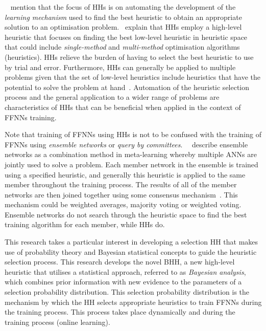\citeauthor{ref:grobler:2012}~\cite{ref:grobler:2012} mention that the focus of \acp{HH} is on automating the development of the \textit{learning mechanism} used to find the best heuristic to obtain an appropriate solution to an optimisation problem.~\citeauthor{ref:grobler:2012} explain that \acp{HH} employ a high-level heuristic that focuses on finding the best low-level heuristic in heuristic space that could include \textit{single-method} and \textit{multi-method} optimisation algorithms (heuristics). \acp{HH} relieve the burden of having to select the best heuristic to use by trial and error. Furthermore, \acp{HH} can generally be applied to multiple problems given that the set of low-level heuristics include heuristics that have the potential to solve the problem at hand~\cite{ref:burke:2010}. Automation of the heuristic selection process and the general application to a wider range of problems are characteristics of \acp{HH} that can be beneficial when applied in the context of \acp{FFNN} training.

Note that training of \acp{FFNN} using \acp{HH} is not to be confused with the training of \acp{FFNN} using \textit{ensemble networks} or \textit{query by committees}.~\citeauthor{ref:pappa:2014}~\cite{ref:pappa:2014} describe ensemble networks as a combination method in meta-learning whereby multiple \acp{ANN} are jointly used to solve a problem. Each member network in the ensemble is trained using a specified heuristic, and generally this heuristic is applied to the same member throughout the training process. The results of all of the member networks are then joined together using some consensus mechanism~\cite{ref:zhou:2002}. This mechanism could be weighted averages, majority voting or weighted voting. Ensemble networks do not search through the heuristic space to find the best training algorithm for each member, while \acp{HH} do.

This research takes a particular interest in developing a selection \acs{HH} that makes use of probability theory and Bayesian statistical concepts to guide the heuristic selection process. This research develops the novel \Acf{BHH}, a new high-level heuristic that utilises a statistical approach, referred to as \textit{Bayesian analysis}, which combines prior information with new evidence to the parameters of a selection probability distribution. This selection probability distribution is the mechanism by which the \acs{HH} selects appropriate heuristics to train \acp{FFNN} during the training process. This process takes place dynamically and during the training process (online learning).


